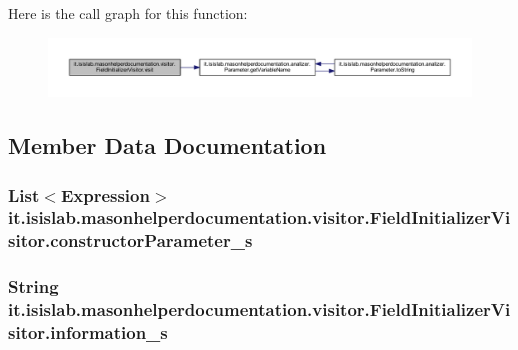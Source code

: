 Here is the call graph for this function\-:\nopagebreak
\begin{figure}[H]
\begin{center}
\leavevmode
\includegraphics[width=350pt]{classit_1_1isislab_1_1masonhelperdocumentation_1_1visitor_1_1_field_initializer_visitor_aa102c9e14ce33b802171e97ff59c6522_cgraph}
\end{center}
\end{figure}




\subsection{Member Data Documentation}
\hypertarget{classit_1_1isislab_1_1masonhelperdocumentation_1_1visitor_1_1_field_initializer_visitor_ababaa84c922c5ce27fc9880abe7ae4dd}{
\subsubsection[{constructor\-Parameter\-\_\-s}]{\setlength{\rightskip}{0pt plus 5cm}List$<$Expression$>$ it.\-isislab.\-masonhelperdocumentation.\-visitor.\-Field\-Initializer\-Visitor.\-constructor\-Parameter\-\_\-s\hspace{0.3cm}{\ttfamily [private]}}}\label{classit_1_1isislab_1_1masonhelperdocumentation_1_1visitor_1_1_field_initializer_visitor_ababaa84c922c5ce27fc9880abe7ae4dd}
\hypertarget{classit_1_1isislab_1_1masonhelperdocumentation_1_1visitor_1_1_field_initializer_visitor_af2beae06e1c3a7541b19ceeb6be6c7b8}{
\subsubsection[{information\-\_\-s}]{\setlength{\rightskip}{0pt plus 5cm}String it.\-isislab.\-masonhelperdocumentation.\-visitor.\-Field\-Initializer\-Visitor.\-information\-\_\-s\hspace{0.3cm}{\ttfamily [private]}}}\label{classit_1_1isislab_1_1masonhelperdocumentation_1_1visitor_1_1_field_initializer_visitor_af2beae06e1c3a7541b19ceeb6be6c7b8}
